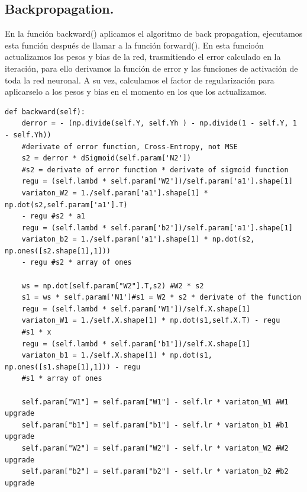 \documentclass[a4paper,10pt]{article}
\begin{document}
\subsection{Backpropagation.}
\noindent
En la función backward() aplicamos el algoritmo de back propagation, ejecutamos esta función después de llamar a la función forward(). En esta funcioón actualizamos los pesos y bias de la red, trasmitiendo el error calculado en la iteración, para ello derivamos la función de error y las funciones de activación de toda la red neuronal. A su vez, calculamos el factor de regularización para aplicarselo a los pesos y bias en el momento en los que los actualizamos.
\begin{lstlisting}
def backward(self):
    derror = - (np.divide(self.Y, self.Yh ) - np.divide(1 - self.Y, 1 - self.Yh))
    #derivate of error function, Cross-Entropy, not MSE
    s2 = derror * dSigmoid(self.param['N2']) 
    #s2 = derivate of error function * derivate of sigmoid function 
    regu = (self.lambd * self.param['W2'])/self.param['a1'].shape[1]
    variaton_W2 = 1./self.param['a1'].shape[1] * np.dot(s2,self.param['a1'].T)
    - regu #s2 * a1
    regu = (self.lambd * self.param['b2'])/self.param['a1'].shape[1]
    variaton_b2 = 1./self.param['a1'].shape[1] * np.dot(s2, np.ones([s2.shape[1],1])) 
    - regu #s2 * array of ones

    ws = np.dot(self.param["W2"].T,s2) #W2 * s2                    
    s1 = ws * self.param['N1']#s1 = W2 * s2 * derivate of the function       
    regu = (self.lambd * self.param['W1'])/self.X.shape[1]
    variaton_W1 = 1./self.X.shape[1] * np.dot(s1,self.X.T) - regu
    #s1 * x
    regu = (self.lambd * self.param['b1'])/self.X.shape[1]
    variaton_b1 = 1./self.X.shape[1] * np.dot(s1, np.ones([s1.shape[1],1])) - regu 
    #s1 * array of ones 
    
    self.param["W1"] = self.param["W1"] - self.lr * variaton_W1 #W1 upgrade
    self.param["b1"] = self.param["b1"] - self.lr * variaton_b1 #b1 upgrade
    self.param["W2"] = self.param["W2"] - self.lr * variaton_W2 #W2 upgrade
    self.param["b2"] = self.param["b2"] - self.lr * variaton_b2 #b2 upgrade
        
\end{lstlisting}
\end{document}
